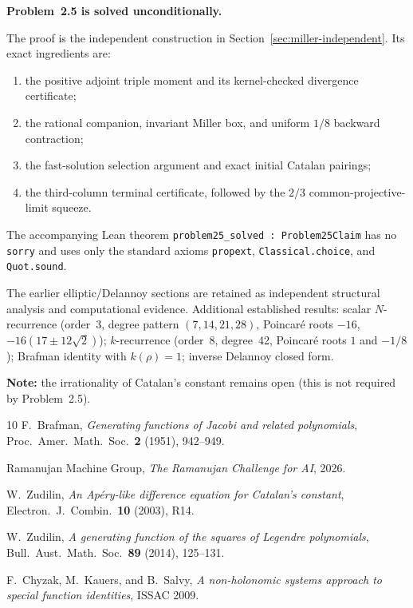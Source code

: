 \documentclass[11pt]{article}
\begin{document}
\textbf{Problem~2.5 is solved unconditionally.}

The proof is the independent construction in
Section~\ref{sec:miller-independent}.  Its exact ingredients are:
\begin{enumerate}
\item the positive adjoint triple moment and its kernel-checked
  divergence certificate;
\item the rational companion, invariant Miller box, and uniform
  $1/8$ backward contraction;
\item the fast-solution selection argument and exact initial
  Catalan pairings;
\item the third-column terminal certificate, followed by the
  $2/3$ common-projective-limit squeeze.
\end{enumerate}
The accompanying Lean theorem
\texttt{problem25\_solved : Problem25Claim} has no
\texttt{sorry} and uses only the standard axioms
\texttt{propext}, \texttt{Classical.choice}, and
\texttt{Quot.sound}.

The earlier elliptic/Delannoy sections are retained as independent
structural analysis and computational evidence.  Additional established
results:
scalar $N$-recurrence (order~3, degree pattern $(7,14,21,28)$,
Poincar\'e roots $-16$, $-16(17\pm 12\sqrt{2})$);
$k$-recurrence (order~8, degree~42, Poincar\'e roots
$1$ and $-1/8$);
Brafman identity with $k(\rho)=1$;
inverse Delannoy closed form.

\textbf{Note:} the irrationality of Catalan's constant
remains open (this is not required by Problem~2.5).

\begin{thebibliography}{10}
F.~Brafman,
\emph{Generating functions of Jacobi and related polynomials},
Proc.\ Amer.\ Math.\ Soc.\ \textbf{2} (1951), 942--949.

Ramanujan Machine Group,
\emph{The Ramanujan Challenge for AI}, 2026.

W.~Zudilin,
\emph{An Ap\'ery-like difference equation for Catalan's
constant},
Electron.\ J.\ Combin.\ \textbf{10} (2003), R14.

W.~Zudilin,
\emph{A generating function of the squares of Legendre
polynomials},
Bull.\ Aust.\ Math.\ Soc.\ \textbf{89} (2014), 125--131.

F.~Chyzak, M.~Kauers, and B.~Salvy,
\emph{A non-holonomic systems approach to special function
identities},
ISSAC 2009.
\end{thebibliography}
\end{document}
